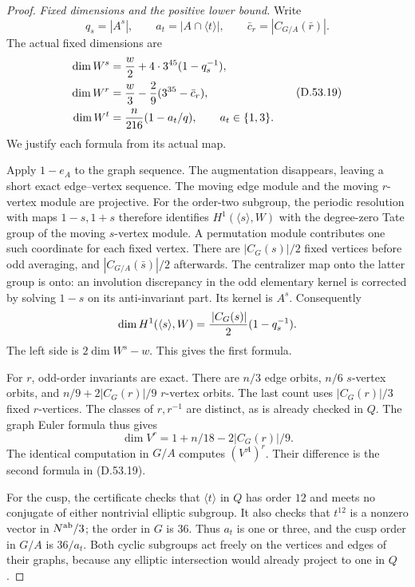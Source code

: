 \begin{proof}
\emph{Fixed dimensions and the positive lower bound.}
Write
\[
 q_s=|A^s|,\qquad a_t=|A\cap\langle t\rangle|,
 \qquad \bar c_r=|C_{G/A}(\bar r)|.
\]
The actual fixed dimensions are
\[
 \begin{aligned}
 \dim W^s&={w\over2}
               +4\cdot3^{45}(1-q_s^{-1}),\\
 \dim W^r&={w\over3}
               -{2\over9}(3^{35}-\bar c_r),\\
 \dim W^t&={n\over216}(1-a_t/q),
                    \qquad a_t\in\{1,3\}.
 \end{aligned}
 \tag{D.53.19}
\]
We justify each formula from its actual map.

Apply \(1-e_A\) to the graph sequence.
The augmentation disappears, leaving a
short exact edge--vertex sequence.
The moving edge module and the moving
\(r\)-vertex module are projective.
For the order-two subgroup, the periodic
resolution with maps \(1-s,1+s\) therefore
identifies \(H^1(\langle s\rangle,W)\)
with the degree-zero Tate group of the
moving \(s\)-vertex module.
A permutation module contributes one
such coordinate for each fixed vertex.
There are \(|C_G(s)|/2\) fixed vertices
before odd averaging, and
\(|C_{G/A}(\bar s)|/2\) afterwards.
The centralizer map onto the latter
group is onto: an involution discrepancy
in the odd elementary kernel is corrected
by solving \(1-s\) on its anti-invariant
part. Its kernel is \(A^s\).
Consequently
\[
 \dim H^1(\langle s\rangle,W)
    ={\,|C_G(s)|\over2}(1-q_s^{-1}).
\]
The left side is \(2\dim W^s-w\).
This gives the first formula.

For \(r\), odd-order invariants are exact.
There are \(n/3\) edge orbits, \(n/6\)
\(s\)-vertex orbits, and
\(n/9+2|C_G(r)|/9\) \(r\)-vertex orbits.
The last count uses
\(|C_G(r)|/3\) fixed \(r\)-vertices.
The classes of \(r,r^{-1}\) are distinct,
as is already checked in \(Q\).
The graph Euler formula thus gives
\[
       \dim V^r=1+n/18-2|C_G(r)|/9.
\]
The identical computation in \(G/A\)
computes \((V^A)^r\). Their difference
is the second formula in (D.53.19).

For the cusp, the certificate checks
that \(\langle t\rangle\) in \(Q\)
has order \(12\) and meets no conjugate
of either nontrivial elliptic subgroup.
It also checks that \(t^{12}\) is a
nonzero vector in \(N^{\rm ab}/3\);
the order in \(G\) is \(36\).
Thus \(a_t\) is one or three, and the
cusp order in \(G/A\) is \(36/a_t\).
Both cyclic subgroups act freely on
the vertices and edges of their graphs,
because any elliptic intersection
would already project to one in \(Q\).


\end{proof}
